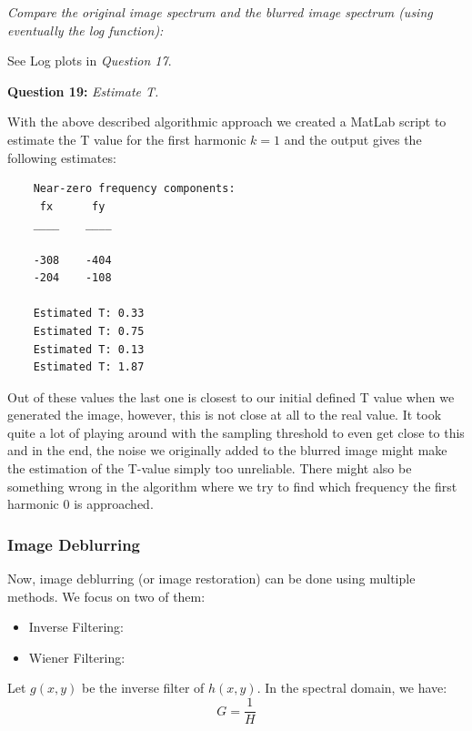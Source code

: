 \textit{Compare the original image spectrum and the blurred image spectrum (using eventually the log function):}

See Log plots in \textit{Question 17}. 



\textbf{Question 19:} \textit{Estimate T.}

With the above described algorithmic approach we created a MatLab script to estimate the T value for the first harmonic $k=1$ and the output gives the following estimates:
\begin{lstlisting}
    Near-zero frequency components:
     fx      fy 
    ____    ____
    
    -308    -404
    -204    -108
    
    Estimated T: 0.33
    Estimated T: 0.75
    Estimated T: 0.13
    Estimated T: 1.87
\end{lstlisting}

Out of these values the last one is closest to our initial defined T value when we generated the image, however, this is not close at all to the real value. It took quite a lot of playing around with the sampling threshold to even get close to this and in the end, the noise we originally added to the blurred image might make the estimation of the T-value simply too unreliable. There might also be something wrong in the algorithm where we try to find which frequency the first harmonic 0 is approached.


\subsubsection{Image Deblurring}

Now, image deblurring (or image restoration) can be done using multiple methods. We focus on two of them:
\begin{itemize}
    \item Inverse Filtering: 
    \item Wiener Filtering: 
\end{itemize}

Let $g(x, y)$ be the inverse filter of $h(x, y)$. In the spectral domain, we have:
\begin{equation}
    G = \frac{1}{H}
\end{equation}

